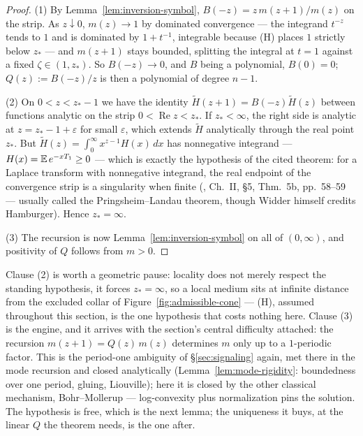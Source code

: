 \begin{proof}
(1) By Lemma~\ref{lem:inversion-symbol}, $B(-z) = z\,m(z+1)/m(z)$ on the strip. As
$z \downarrow 0$, $m(z) \to 1$ by dominated convergence --- the integrand $t^{-z}$ tends to
$1$ and is dominated by $1 + t^{-1}$, integrable because (H) places $1$ strictly below $z_*$
--- and $m(z+1)$ stays bounded, splitting the integral at $t = 1$ against a fixed
$\zeta \in (1, z_*)$. So $B(-z) \to 0$, and $B$ being a polynomial, $B(0) = 0$;
$Q(z) := B(-z)/z$ is then a polynomial of degree $n-1$.

(2) On $0 < z < z_* - 1$ we have the identity $\tilde H(z+1) = B(-z)\tilde H(z)$ between
functions analytic on the strip $0 < \operatorname{Re} z < z_*$. If $z_* < \infty$, the right
side is analytic at $z = z_* - 1 + \varepsilon$ for small $\varepsilon$, which extends
$\tilde H$ analytically through the real point $z_*$. But $\tilde H(z) = \int_0^\infty
x^{z-1}H(x)\,dx$ has nonnegative integrand --- $H(x) = \mathbb{E}\,e^{-xT_1} \ge 0$ --- which is
exactly the hypothesis of the cited theorem: for a Laplace transform with nonnegative
integrand, the real endpoint of the convergence strip is a singularity when finite
(, Ch.~II, \S5, Thm.~5b, pp.~58--59 --- usually called the
Pringsheim--Landau theorem, though Widder himself credits Hamburger). Hence $z_* = \infty$.

(3) The recursion is now Lemma~\ref{lem:inversion-symbol} on all of $(0,\infty)$, and
positivity of $Q$ follows from $m > 0$.
\end{proof}

Clause (2) is worth a geometric pause: locality does not merely respect the standing
hypothesis, it forces $z_* = \infty$, so a local medium sits at infinite distance from the
excluded collar of Figure~\ref{fig:admissible-cone} --- (H), assumed throughout this
section, is the one hypothesis that costs nothing here. Clause (3) is the engine, and it
arrives with the section's central difficulty attached: the recursion
$m(z+1) = Q(z)\,m(z)$ determines $m$ only up to a $1$-periodic factor. This is the
period-one ambiguity of \S\ref{sec:signaling} again, met there in the mode recursion and
closed analytically (Lemma~\ref{lem:mode-rigidity}: boundedness over one period, gluing,
Liouville); here it is closed by the other classical mechanism, Bohr--Mollerup ---
log-convexity plus normalization pins the solution. The hypothesis is free, which is the
next lemma; the uniqueness it buys, at the linear $Q$ the theorem needs, is the one after.

